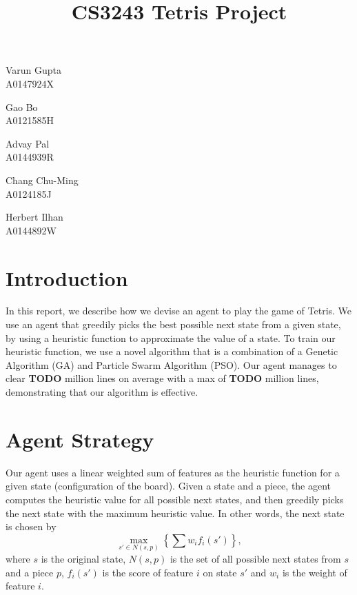 \documentclass[12pt]{article}
\title{CS3243 Tetris Project}
\author{}
\date{}
\begin{document}
	\vspace{-4cm}
	\maketitle
	\thispagestyle{empty}
	\vspace{-3cm}

	\begin{center}
		\begin{minipage}{0.19\textwidth}
			Varun Gupta\\A0147924X
		\end{minipage}
		\begin{minipage}{0.19\textwidth}
			Gao Bo\\A0121585H
		\end{minipage}
		\begin{minipage}{0.19\textwidth}
			Advay Pal\\A0144939R
		\end{minipage}
		\begin{minipage}{0.19\textwidth}
			Chang Chu-Ming\\A0124185J
		\end{minipage}
		\begin{minipage}{0.19\textwidth}
			Herbert Ilhan\\A0144892W
		\end{minipage}
	\end{center}

    \section{Introduction}
	\vspace{-0.3cm}
    In this report, we describe how we devise an agent to play the game of Tetris.
    We use an agent that greedily picks the best possible next state from a given state,
    by using a heuristic function to approximate the value of a state. To train our heuristic
    function, we use a novel algorithm that is a combination of a Genetic Algorithm (GA)
    and Particle Swarm Algorithm (PSO). Our agent manages to clear \textbf{TODO} million lines on average with a max
    of \textbf{TODO} million lines, demonstrating that our algorithm is effective.

    \section{Agent Strategy}
	\vspace{-0.3cm}
	Our agent uses a linear weighted sum of features as the heuristic function for
	a given state (configuration of the board). Given a
	state and a piece, the agent computes the heuristic value for all possible next
	states, and then greedily picks the next state with the maximum heuristic
	value. In other words, the next state is chosen by \small \[ \max_{s' \in N(s, p)}
	\left\{ \sum w_i f_i(s') \right\}, \] \normalsize where $s$ is the original state, $N(s,
	p)$ is the set of all possible next states from $s$ and a piece $p$, $f_i(s')$
	is the score of feature $i$ on state $s'$ and $w_i$ is the weight of feature
	$i$.
\end{document}

